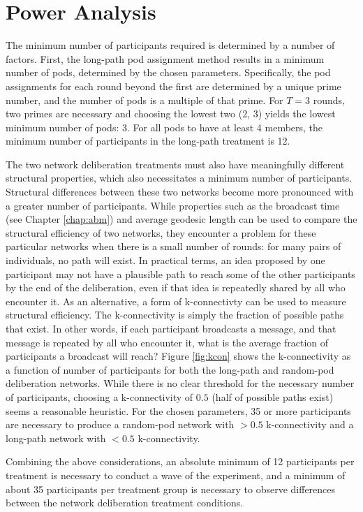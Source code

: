 \section{Power Analysis}
The minimum number of participants required is determined by a number of factors.
First, the long-path pod assignment method results in a minimum number of pods,
determined by the chosen parameters.
Specifically, the pod assignments for each round beyond the first are determined
by a unique prime number,
and the number of pods is a multiple of that prime.
For $T=3$ rounds, two primes are necessary and choosing the lowest two (2, 3)
yields the lowest minimum number of pods: 3.
For all pods to have at least 4 members, the minimum number of participants in
the long-path treatment is 12.

The two network deliberation treatments must also have meaningfully different
structural properties,
which also necessitates a minimum number of participants.
Structural differences between these two networks become more pronounced
with a greater number of participants.
While properties such as the broadcast time (see Chapter \ref{chap:abm})
and average geodesic length can be used to compare the structural efficiency of
two networks,
they encounter a problem for these particular networks
when there is a small number of rounds:
for many pairs of individuals, no path will exist.
In practical terms,
an idea proposed by one participant may not have a plausible
path to reach some of the other participants by the end of the deliberation,
even if that idea is repeatedly shared by all who encounter it.
As an alternative, a form of k-connectivty can be used to measure
structural efficiency.
The k-connectivity is simply the fraction of possible paths that exist.
In other words, if each participant broadcasts a message, and that message is
repeated by all who encounter it, what is the average fraction of participants
a broadcast will reach?
Figure \ref{fig:kcon} shows the k-connectivity as a function of number of
participants for both the long-path and random-pod deliberation networks.
While there is no clear threshold for the necessary number of participants,
choosing a k-connectivity of $0.5$ (half of possible paths exist) seems a
reasonable heuristic.
For the chosen parameters, 35 or more participants are necessary to produce
a random-pod network with $>0.5$ k-connectivity and
a long-path network with $<0.5$ k-connectivity.

Combining the above considerations,
an absolute minimum of 12 participants per treatment is necessary to conduct
a wave of the experiment,
and a minimum of about 35 participants per treatment group is necessary to
observe differences between the network deliberation treatment conditions.

